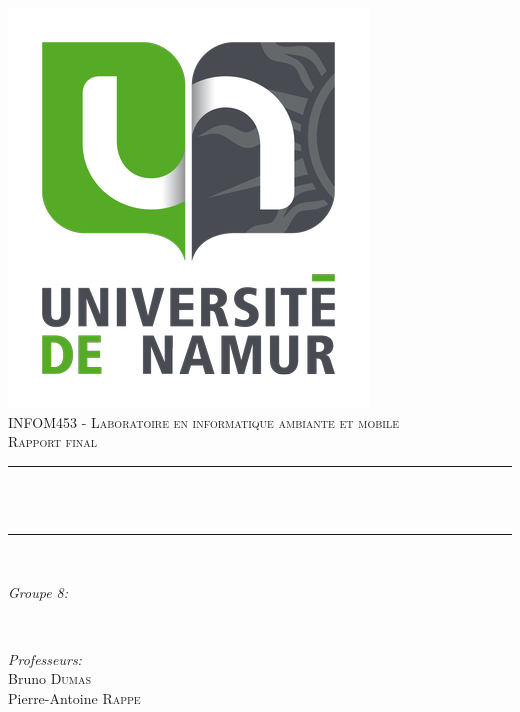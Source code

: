 \begin{titlepage}
  \centering
  \vspace*{1 cm}
  \includegraphics[scale = 0.3]{img/logo-unamur.png}\\[2.0 cm]
  \textsc{\large INFOM453 - Laboratoire en informatique ambiante et mobile}\\[0.5 cm]
  \textsc{\Large Rapport final}\\[0.5 cm]
  \rule{\linewidth}{0.2 mm} \\[0.4 cm]
  { \huge \bfseries \thetitle}\\
  \rule{\linewidth}{0.2 mm} \\[1.5 cm]

  \begin{minipage}[t]{0.4\textwidth}
    \begin{flushleft} \large
      \emph{Groupe 8:}\\
      \theauthor
    \end{flushleft}
  \end{minipage}~
  \begin{minipage}[t]{0.4\textwidth}
    \begin{flushright} \large
      \emph{Professeurs:} \\
      Bruno \textsc{Dumas}\\
      Pierre-Antoine \textsc{Rappe}
    \end{flushright}
  \end{minipage}\\[2 cm]
  \vfill
  {\large \thedate}\\[2 cm]

\end{titlepage}